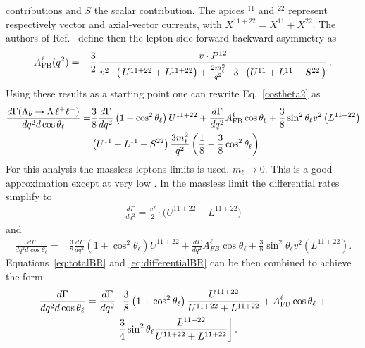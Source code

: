 contributions and $S$ the scalar contribution. The apices $^{11}$ and $^{22}$ represent respectively
vector and axial-vector currents, with $X^{11+22} = X^{11} + X^{22}$.
The authors of Ref.~\cite{Gutsche:2013pp} define then the lepton-side forward-backward asymmetry as
\begin{equation}
A_{\rm FB}^{\ell}(q^{2}) 
= - \frac{3}{2}\,\frac{v\cdot P^{12}}
{v^{2}\cdot\big(\,U^{11+22}
+L^{11+22}\big)+\frac{2m_{\ell}^{2}}{q^{2}}\cdot 3 \cdot
\big(U^{11}+L^{11}
+S^{22}\,\big) }\,.
\label{eq:afbDef}
\end{equation}
%
%
%
Using these results as a starting point one can rewrite Eq.~\ref{costheta2} as
\begin{align}
\frac{d\Gamma(\Lambda_{b}\to \Lambda \,\ell^{+}\ell^{-})}{dq^2d\cos\theta_\ell}=&
\frac{3}{8}\frac{d\Gamma}{dq^2}\left(1+\cos^2\theta_\ell\right)U^{11+22}+
\frac{d\Gamma}{dq^2}A_{\rm FB}^\ell\cos\theta_\ell+
\frac{3}{8}\sin^2\theta_\ell v^2\left(L^{11+22}\right) \nonumber \\
&\left(U^{11}+L^{11}+S^{22}\right)\frac{3m_\ell^2}{q^2}\left(\frac{1}{8}-\frac{3}{8}\cos^2\theta_\ell\right)
\end{align}
For this analysis the massless leptons limits is used, $m_\ell \rightarrow 0$. This is a good
approximation except at very low \qsq. In the massless limit the differential rates simplify to
\begin{eqnarray}
\frac{d\Gamma}{d q^2}=
\frac{v^{2}}{2}\cdot\bigg( U^{11+22} + L^{11+22} \bigg)
\label{eq:totalBR}
\end{eqnarray}
and
\begin{align}
\frac{d\Gamma}{dq^2d\cos\theta_\ell}=&
\frac{3}{8}\frac{d\Gamma}{dq^2}\left(1+\cos^2\theta_\ell\right)U^{11+22}+
\frac{d\Gamma}{dq^2}A_{FB}^\ell\cos\theta_\ell+
\frac{3}{8}\sin^2\theta_\ell v^2\left(L^{11+22}\right).
\label{eq:differentialBR}
\end{align}
%
%
Equations~\ref{eq:totalBR} and \ref{eq:differentialBR} can be then combined to achieve the form
\begin{align}
\frac{d\Gamma}{dq^2d\cos\theta_\ell}=
\frac{d\Gamma}{dq^2}&\left[
\frac{3}{8}\left(1+\cos^2\theta_\ell\right)\frac{U^{11+22}}{U^{11+22}+L^{11+22}}+A_{\rm FB}^\ell\cos\theta_\ell\right . +
 \nonumber \\
& \left. \frac{3}{4}\sin^2\theta_\ell\frac{L^{11+22}}{U^{11+22}+L^{11+22}}\right].
\end{align}
